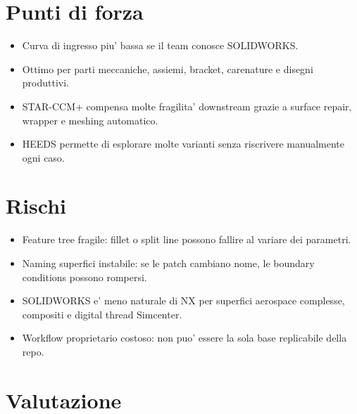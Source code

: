 \section{Punti di forza}

\begin{itemize}
    \item Curva di ingresso piu' bassa se il team conosce SOLIDWORKS.
    \item Ottimo per parti meccaniche, assiemi, bracket, carenature e disegni produttivi.
    \item STAR-CCM+ compensa molte fragilita' downstream grazie a surface repair, wrapper e meshing automatico.
    \item HEEDS permette di esplorare molte varianti senza riscrivere manualmente ogni caso.
\end{itemize}

\section{Rischi}

\begin{itemize}
    \item Feature tree fragile: fillet o split line possono fallire al variare dei parametri.
    \item Naming superfici instabile: se le patch cambiano nome, le boundary conditions possono rompersi.
    \item SOLIDWORKS e' meno naturale di NX per superfici aerospace complesse, compositi e digital thread Simcenter.
    \item Workflow proprietario costoso: non puo' essere la sola base replicabile della repo.
\end{itemize}

\section{Valutazione}

